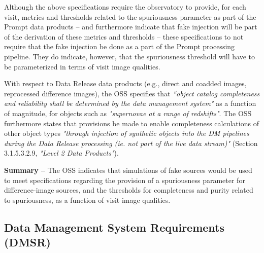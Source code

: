 \documentclass[DM,lsstdraft,toc]{lsstdoc}
\begin{document}
Although the above specifications require the observatory to provide, for each visit, metrics and thresholds related to the spuriousness parameter as part of the Prompt data products -- and furthermore indicate that fake injection will be part of the derivation of these metrics and thresholds -- these specifications to not require that the fake injection be done as a part of the Prompt processing pipeline. They do indicate, however, that the spuriousness threshold will have to be parameterized in terms of visit image qualities.

With respect to Data Release data products (e.g., direct and coadded images, reprocessed difference images), the OSS specifies that {\it ``object catalog completeness and reliability shall be determined by the data management system"} as a function of magnitude, for objects such as {\it "supernovae at a range of redshifts"}. The OSS furthermore states that provisions be made to enable completeness calculations of other object types {\it "through injection of synthetic objects into the DM pipelines during the Data Release processing (ie. not part of the live data stream)"} (Section 3.1.5.3.2.9, {\it "Level 2 Data Products"}).

{\bf Summary --} The OSS indicates that simulations of fake sources would be used to meet specifications regarding the provision of a spuriousness parameter for difference-image sources, and the thresholds for completeness and purity related to spuriousness, as a function of visit image qualities. 



\subsection{Data Management System Requirements (DMSR)}\label{ssec:docs_dmsr}
\end{document}
